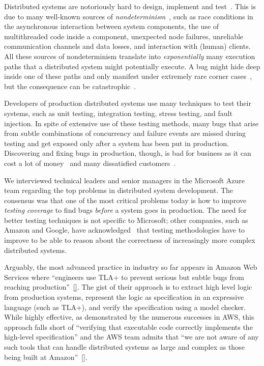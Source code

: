 Distributed systems are notoriously hard to design, implement and test~\cite{cavage2013there, laguna2015debugging, maddox2015test}. This is due to many well-known sources of \emph{nondeterminism}~\cite{chandra2007paxos}, such as race conditions in the asynchronous interaction between system components, the use of multithreaded code inside a component, unexpected node failures, unreliable communication channels and data losses, and interaction with (human) clients.
All these sources of nondeterminism translate into \emph{exponentially} many execution paths that a distributed system might potentially execute.
A bug might hide deep inside one of these paths and only manifest under extremely rare corner cases~\cite{gray1986computers, musuvathi2008finding}, but the consequence can be catastrophic~\cite{amazon2012aws, google2014outage}.

Developers of production distributed systems use many techniques to test their systems,
such as unit testing, integration testing, stress testing, and fault injection.
In spite of extensive use of these testing methods,
many bugs that arise from subtle combinations of concurrency and failure events
are missed during testing and get exposed only after a system has been put in production.
Discovering and fixing bugs in production, though, is bad for business as it can cost a lot of money~\cite{tassey2002economic} 
and many dissatisfied customers~\cite{amazon2012aws, google2014outage}.

We interviewed technical leaders and senior managers in the Microsoft Azure team regarding the top problems in distributed system development.
The consensus was that one of the most critical problems today is how to improve \emph{testing coverage} to find bugs \emph{before} a system goes in production.
The need for better testing techniques is not specific to Microsoft;
other companies, such as Amazon and Google, have acknowledged~\cite{chandra2007paxos,newcombe2015aws} that testing methodologies have to improve to be able to reason about the correctness of increasingly more complex distributed systems.

Arguably, the most advanced practice in industry so far appears in Amazon Web Services where ``engineers use TLA+ to prevent serious but subtle bugs from reaching production''~\ref{}. The gist of their approach is to extract high level logic from production systems, represent the logic as specification in an expressive language (such as TLA+), and verify the specification using a model checker. While highly effective, as demonstrated by the numerous successes in AWS, this approach falls short of ``verifying that executable code correctly implements the high-level specification'' and the AWS team admits that ``we are not aware of any such tools that can handle distributed systems as large and complex as those being built at Amazon''~\ref{}.

